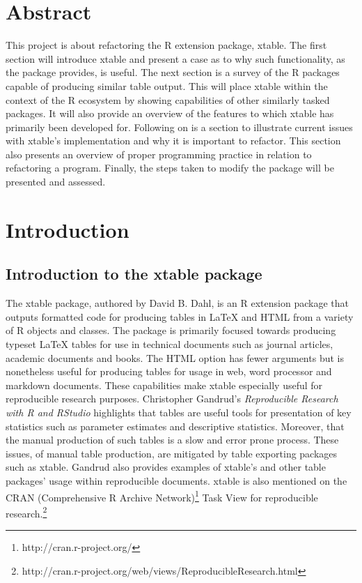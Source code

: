 \documentclass{memoir}\usepackage[]{graphicx}\usepackage[]{color}
\newcommand{\pkg}[1]{{\fontseries{b}\selectfont #1}}
\newcommand{\latex}{\LaTeX\xspace}
\begin{document}
\newpage\leavevmode\thispagestyle{empty}\newpage

\chapter*{Abstract}
This project is about refactoring the \pkg{R} extension package, \pkg{xtable}. The first section will introduce \pkg{xtable} and present a case as to why such functionality, as the package provides, is useful. The next section is a survey of the R packages capable of producing similar table output. This will place \pkg{xtable} within the context of the R ecosystem by showing capabilities of other similarly tasked packages. It will also provide an overview of the features to which \pkg{xtable} has primarily been developed for. Following on is a section to illustrate current issues with \pkg{xtable}'s implementation and why it is important to refactor. This section also presents an overview of proper programming practice in relation to refactoring a program. Finally, the steps taken to modify the package will be presented and assessed.


\newpage\leavevmode\thispagestyle{empty}\newpage

\tableofcontents*

\mainmatter
\pagestyle{ruled}

\chapter{Introduction}


\section{Introduction to the xtable package}


The \pkg{xtable}\cite{xtable} package, authored by David B. Dahl,  is an R\cite{R} extension package that outputs formatted code for producing tables in \latex and HTML from a variety of R objects and classes. The package is primarily focused towards producing typeset \latex  tables for use in technical documents such as journal articles, academic documents and books. The HTML option has fewer arguments but is nonetheless useful for producing tables for usage in web, word processor and markdown documents. These capabilities make \pkg{xtable} especially useful for reproducible research purposes. Christopher Gandrud's \textit{Reproducible Research with R and RStudio}\cite{gan13} highlights that tables are useful tools for presentation of key statistics such as parameter estimates and descriptive statistics. Moreover, that the manual production of such tables is a slow and error prone process. These issues, of manual table production, are mitigated by table exporting packages such as \pkg{xtable}. Gandrud also provides examples of \pkg{xtable's} and other table packages' usage within reproducible documents\cite{gan13}. \pkg{xtable} is also mentioned on the CRAN (Comprehensive R Archive Network)\footnote{http://cran.r-project.org/} Task View for reproducible research.\footnote{http://cran.r-project.org/web/views/ReproducibleResearch.html}\\
\end{document}

